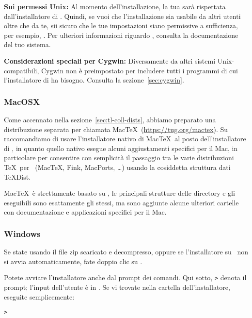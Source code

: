 \documentclass{article}
\begin{document}
\textbf{Sui permessi Unix:} Al momento dell'installazione,
la tua  sarà rispettata dall'installatore di \TL{}.
Quindi, se vuoi che l'installazione sia usabile da altri utenti oltre che da
te, sii sicuro che le tue impostazioni siano permissive a sufficienza, per
esempio, . Per ulteriori informazioni riguardo
, consulta la documentazione del tuo sistema.

\textbf{Considerazioni speciali per Cygwin:} Diversamente da altri sistemi
Unix-compatibili, Cygwin non è preimpostato per includere tutti i
programmi di cui l'installatore di \TL{} ha bisogno. Consulta la
sezione~\ref{sec:cygwin}.


\subsubsection{MacOSX}
\label{sec:macosx}

Come accennato nella sezione~\ref{sec:tl-coll-dists}, abbiamo preparato
una distribuzione separata per \MacOSX{} chiamata Mac\TeX\
(\url{https://tug.org/mactex}). Su \MacOSX{} raccomandiamo di usare
l'installatore nativo di Mac\TeX\ al posto dell'installatore di \TL, in
quanto quello nativo esegue alcuni aggiustamenti specifici per il Mac, in
particolare per consentire con semplicità il passaggio tra le varie
distribuzioni \TeX\ per \MacOSX\ (Mac\TeX, Fink, MacPorts, \ldots)
usando la cosiddetta struttura dati \TeX{}Dist.

Mac\TeX\ è strettamente basato su \TL, le principali strutture delle
directory e gli eseguibili sono esattamente gli stessi, ma sono aggiunte
alcune ulteriori cartelle con documentazione e applicazioni specifici per
il Mac.


\subsubsection{Windows}\label{sec:wininst}

Se state usando il file zip scaricato e decompresso, oppure se
l'installatore su \DVD\ non si avvia automaticamente, fate doppio clic su
\filename{install-tl-windows.bat}.

Potete avviare l'installatore anche dal prompt dei comandi. Qui sotto,
\texttt{>} denota il prompt; l'input dell'utente è in
. Se vi trovate nella cartella dell'installatore,
eseguite semplicemente:
\begin{alltt}
> 
\end{alltt}
\end{document}
